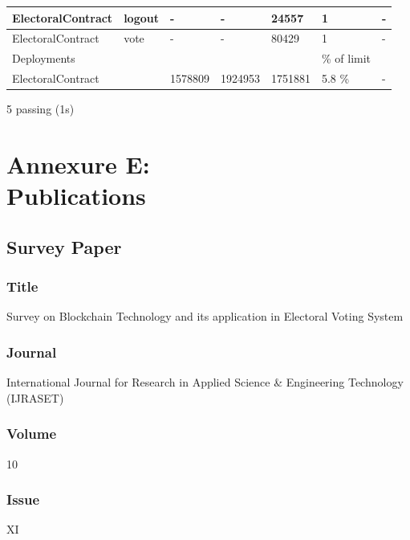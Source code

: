 \documentclass[oneside, 12pt]{book}
\begin{document}
{\begin{minipage}{\linewidth}
\begin{table}[H]
{\begin{tabular}{|ll|lllll|}
						\multicolumn{1}{|l|}{ElectoralContract} & logout            & \multicolumn{1}{l|}{-}       & \multicolumn{1}{l|}{-}       & \multicolumn{1}{l|}{24557}     & \multicolumn{1}{l|}{1}                 & -                  \\ \hline
						\multicolumn{1}{|l|}{ElectoralContract} & vote              & \multicolumn{1}{l|}{-}       & \multicolumn{1}{l|}{-}       & \multicolumn{1}{l|}{80429}     & \multicolumn{1}{l|}{1}                 & -                  \\ \hline
						\multicolumn{2}{|l|}{Deployments}                           & \multicolumn{3}{l|}{}                                                                        & \multicolumn{1}{l|}{\% of limit}       &                    \\ \hline
						\multicolumn{2}{|l|}{ElectoralContract}                     & \multicolumn{1}{l|}{1578809} & \multicolumn{1}{l|}{1924953} & \multicolumn{1}{l|}{1751881}   & \multicolumn{1}{l|}{5.8 \%}            & -                  \\ \hline
					\end{tabular}%
				}
			\end{table}
			5 passing (1s)
			\vspace*{2pt}
		\end{minipage}%
	}
	\newpage
	\section{Annexure E:\\Publications}
	\newpage
		\subsection{Survey Paper}
			\subsubsection{Title}
				Survey on Blockchain Technology and its application in Electoral Voting System
			\subsubsection{Journal}
				International Journal for Research in Applied Science \& Engineering Technology (IJRASET)
			\subsubsection{Volume}
				10
			\subsubsection{Issue}
				XI
\end{document}
